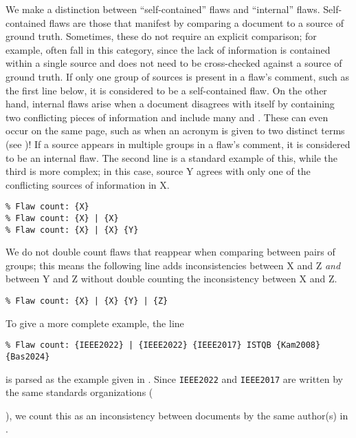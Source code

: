 We make a distinction between ``self-contained''
flaws and ``internal'' flaws. Self-contained flaws are those that manifest by
comparing a document to a source of ground truth. Sometimes, these do not
require an explicit comparison; for example,  often fall in this
category, since the lack of information is contained within a single source and
does not need to be cross-checked against a source of ground truth. If only one
group of sources is present in a flaw's comment, such as the first line
below, it is considered to be a self-contained flaw. On the other hand,
internal flaws arise when a document disagrees with itself by containing two
conflicting pieces of information and include many  and
. These can even occur on the same page, such as when an acronym
is given to two distinct terms (see )! If a
source appears in multiple groups in a flaw's comment, it is considered to
be an internal flaw. The second line is a standard example of this, while the
third is more complex; in this case, source Y agrees with only one of the
conflicting sources of information in X.
\begin{displayquote}
    \texttt{\% Flaw count: \{X\}\\\% Flaw count: \{X\} | \{X\}\\
        \% Flaw count: \{X\} | \{X\} \{Y\}}
\end{displayquote}
We do not double count flaws that reappear when comparing between pairs of
groups; this means the following line adds inconsistencies between X and Z
\emph{and} between Y and Z without double counting the inconsistency between
X and Z.
\begin{displayquote}
    \texttt{\% Flaw count: \{X\} | \{X\} \{Y\} | \{Z\}}
\end{displayquote}
To give a more complete example, the line
\begin{displayquote}
    \texttt{\% Flaw count: \{IEEE2022\} | \{IEEE2022\} \{IEEE2017\}
        \displayNL ISTQB \{Kam2008\} \{Bas2024\}}
\end{displayquote}
is parsed as the example given in . Since
\texttt{IEEE2022} and \texttt{IEEE2017} are written by the same standards
organizations (\begin{NoHyper}\citeauthor{IEEE2022}\end{NoHyper}), we count
this as an inconsistency between documents by the same author(s) in
.

